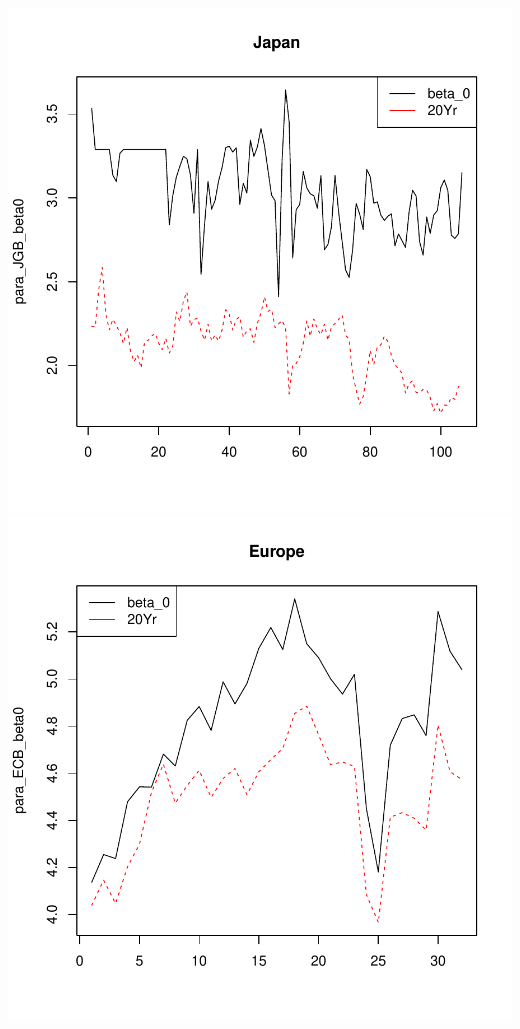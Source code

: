\documentclass{article}
\begin{document}
\begin{spacing}{1.5}
\begin{center}
\includegraphics{Graduation_Paper-020}
\includegraphics{Graduation_Paper-021}

\end{center}
\end{spacing}
\end{document}
